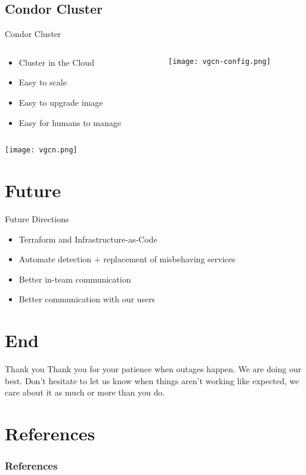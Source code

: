 \documentclass[12pt]{ufrslides}
\begin{document}
\subsection{Condor Cluster}
\begin{frame}{Condor Cluster}
	\begin{columns}[T] %
		\begin{column}{.48\textwidth}
			\begin{itemize}
				\item Cluster in the Cloud
				\item Easy to scale
				\item Easy to upgrade image
				\item Easy for humans to manage
			\end{itemize}
		\end{column}%
		\hfill%
		\begin{column}{.48\textwidth}
			\texttt{[image: vgcn-config.png]}
		\end{column}%
	\end{columns}

	\vfill
	\texttt{[image: vgcn.png]}
\end{frame}

\section{Future}
\begin{frame}{Future Directions}
	\begin{itemize}
		\item Terraform and Infrastructure-as-Code
		\item Automate detection + replacement of misbehaving services
		\item Better in-team communication
		\item Better communication with our users
	\end{itemize}
\end{frame}



\section{End}
\begin{frame}{Thank you}
Thank you for your patience when outages happen. We are doing our best. Don't
hesitate to let us know when things aren't working like expected, we care about
it as much or more than you do.
\end{frame}

\section{References}
\begin{frame}[allowframebreaks]
	\frametitle{References}
	
	
\end{frame}
\end{document}
